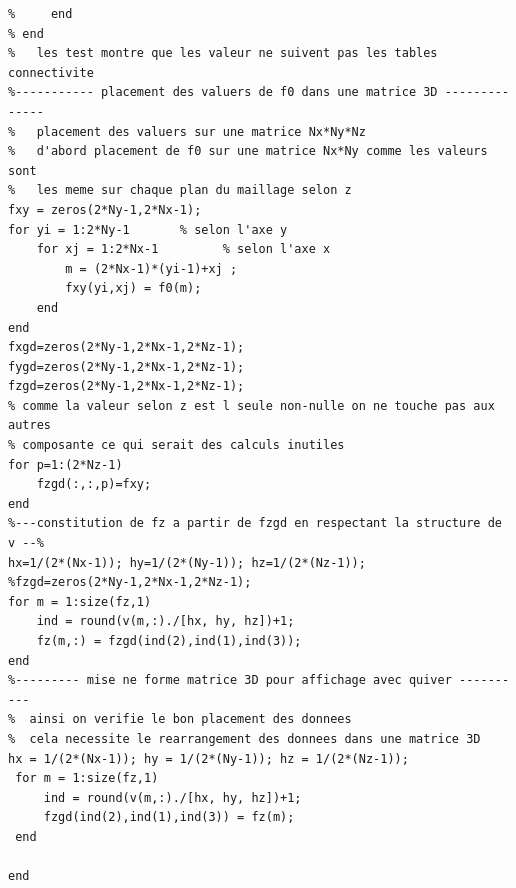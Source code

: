 \documentclass[a4paper,12pt,titlepage]{report}
\begin{document}
\begin{onehalfspace}
\begin{appendix}
\begin{verbatim}
%     end
% end
%   les test montre que les valeur ne suivent pas les tables connectivite
%----------- placement des valuers de f0 dans une matrice 3D --------------
%   placement des valuers sur une matrice Nx*Ny*Nz
%   d'abord placement de f0 sur une matrice Nx*Ny comme les valeurs sont
%   les meme sur chaque plan du maillage selon z
fxy = zeros(2*Ny-1,2*Nx-1);
for yi = 1:2*Ny-1       % selon l'axe y
    for xj = 1:2*Nx-1         % selon l'axe x
        m = (2*Nx-1)*(yi-1)+xj ;
        fxy(yi,xj) = f0(m);
    end
end
fxgd=zeros(2*Ny-1,2*Nx-1,2*Nz-1);
fygd=zeros(2*Ny-1,2*Nx-1,2*Nz-1);
fzgd=zeros(2*Ny-1,2*Nx-1,2*Nz-1);
% comme la valeur selon z est l seule non-nulle on ne touche pas aux autres
% composante ce qui serait des calculs inutiles
for p=1:(2*Nz-1)
    fzgd(:,:,p)=fxy;
end
%---constitution de fz a partir de fzgd en respectant la structure de v --%
hx=1/(2*(Nx-1)); hy=1/(2*(Ny-1)); hz=1/(2*(Nz-1));
%fzgd=zeros(2*Ny-1,2*Nx-1,2*Nz-1);
for m = 1:size(fz,1)
    ind = round(v(m,:)./[hx, hy, hz])+1;
    fz(m,:) = fzgd(ind(2),ind(1),ind(3));
end
%--------- mise ne forme matrice 3D pour affichage avec quiver ----------
%  ainsi on verifie le bon placement des donnees
%  cela necessite le rearrangement des donnees dans une matrice 3D
hx = 1/(2*(Nx-1)); hy = 1/(2*(Ny-1)); hz = 1/(2*(Nz-1));
 for m = 1:size(fz,1)
     ind = round(v(m,:)./[hx, hy, hz])+1;
     fzgd(ind(2),ind(1),ind(3)) = fz(m);
 end

end
\end{verbatim}



\end{appendix}
\end{onehalfspace}
\end{document}
